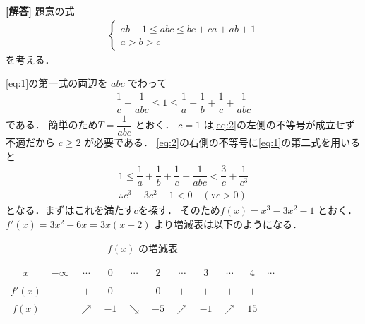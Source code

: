 \documentclass[../../main.tex]{subfiles}
\begin{document}
\begin{oframed}
  
\end{oframed}

{\bf [解答]}
題意の式
\begin{align}
  \begin{cases}
    ab+1 \le abc \le bc+ca+ab+1 \\
    a > b > c
  \end{cases} \label{eq:1}
\end{align}
を考える．

\cref{eq:1}の第一式の両辺を $abc$ でわって
\begin{align}
  \dfrac{1}{c} + \dfrac{1}{abc} \le 1 \le \dfrac{1}{a} + \dfrac{1}{b} + \dfrac{1}{c} + \dfrac{1}{abc} \label{eq:2}
\end{align}
である．
簡単のため$T = \dfrac{1}{abc}$ とおく．
$c=1$ は\cref{eq:2}の左側の不等号が成立せず不適だから $c \ge 2$ が必要である．
\cref{eq:2}の右側の不等号に\cref{eq:1}の第二式を用いると
\begin{align}
  1 \le \dfrac{1}{a} + \dfrac{1}{b} + \dfrac{1}{c} + \dfrac{1}{abc} < \dfrac{3}{c} + \dfrac{1}{c^3} \\
  \therefore
  c^3 - 3c^2 - 1 < 0 \quad (\because c > 0) \label{eq:3}
\end{align}
となる．まずはこれを満たす$c$を探す．
そのため$f(x) = x^3 - 3x^2 - 1$ とおく．$f'(x) = 3x^2 - 6x = 3x(x-2)$ より増減表は以下のようになる．

\begin{table}[htb]
  \centering
  \caption{$f(x)$ の増減表}
  \label{tab:variation}
  \begin{tabular}{c|cccccccccc}
    $x$ & $-\infty$ & $\cdots$ & $0$ & $\cdots$ & $2$ & $\cdots$ & $3$ & $\cdots$ & $4$ & $\cdots$ \\ \hline
    $f'(x)$ & & $+$ & $0$ & $-$ & $0$ & $+$ & $+$ & $+$ & $+$ & \\ \hline
    $f(x)$  & & $\nearrow$ & $-1$ & $\searrow$ & $-5$ & $\nearrow$ & $-1$ & $\nearrow$ & $15$ &
  \end{tabular}
\end{table}
\end{document}
